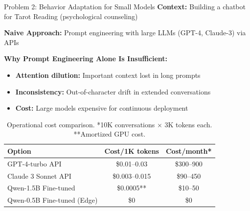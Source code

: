 \documentclass[11pt, aspectratio=169, xcolor=table]{beamer}
\begin{document}
\begin{frame}{Problem 2: Behavior Adaptation for Small Models}
    \textbf{Context:} Building a chatbot for Tarot Reading (psychological counseling)
    
    \vspace{0.3cm}
    \textbf{Naive Approach:} Prompt engineering with large LLMs (GPT-4, Claude-3) via APIs
    
    \vspace{0.3cm}
    \textbf{Why Prompt Engineering Alone Is Insufficient:}
    \begin{itemize}
        \item \textbf{Attention dilution:} Important context lost in long prompts
        \item \textbf{Inconsistency:} Out-of-character drift in extended conversations
        \item \textbf{Cost:} Large models expensive for continuous deployment
    \end{itemize}

    \vspace{0.3cm}
    \begin{table}[H]
        \centering
        \caption{Operational cost comparison. *10K conversations × 3K tokens each. **Amortized GPU cost.}
        \small
        \begin{tabular}{|l|c|c|}
            \hline
            \textbf{Option} & \textbf{Cost/1K tokens} & \textbf{Cost/month*} \\
            \hline
            GPT-4-turbo API & \$0.01--0.03 & \$300--900 \\
            Claude 3 Sonnet API & \$0.003--0.015 & \$90--450 \\
            Qwen-1.5B Fine-tuned & \$0.0005** & \$10--50 \\
            Qwen-0.5B Fine-tuned (Edge) & \$0 & \$0  \\
            \hline
        \end{tabular}
    \end{table}
\end{frame}
\end{document}
